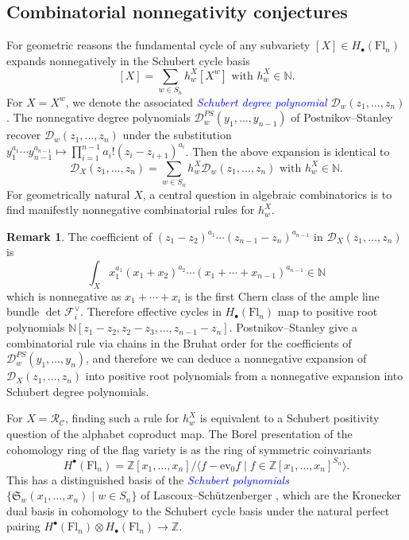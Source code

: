 \documentclass[11pt]{amsart}
\theoremstyle{definition}
\newtheorem{rem}[thm]{Remark}
\numberwithin{equation}{section}
\newcommand{\suchthat}{\;|\;}
\newcommand{\schub}[1]{\mathfrak{S}_{#1}} %
\newcommand{\ct}{\operatorname{ev_0}} %
\newcommand{\fl}[1]{\mathrm{Fl}_{#1}}
\renewcommand\emph[1]{\textcolor{blue}{\textit{#1}}} %
\begin{document}
\subsection{Combinatorial nonnegativity conjectures}
For geometric reasons \cite{Bri05} the fundamental cycle of any subvariety $[X]\in H_\bullet(\fl{n})$ expands nonnegatively in the Schubert cycle basis
$$[X]=\sum_{w\in S_n} h^X_w[X^w]\text{ with }h^X_w\in \mathbb{N}.$$
For $X=X^w$, we denote the associated \emph{Schubert degree polynomial} $\mathcal{D}_w(z_1,\ldots,z_n)$.
The nonnegative degree polynomials $\mathcal{D}_w^{PS}(y_1,\ldots,y_{n-1})$ of Postnikov--Stanley \cite{PS09} recover $\mathcal{D}_w(z_1,\ldots,z_n)$ under the substitution $y_1^{a_1}\cdots y_{n-1}^{a_{n-1}}\mapsto \prod_{i=1}^{n-1} a_i!(z_i-z_{i+1})^{a_i}$.
Then the above expansion is identical to
$$\mathcal{D}_X(z_1,\ldots,z_n)=\sum_{w\in S_n}h^X_w\mathcal{D}_w(z_1,\ldots,z_n)\text{ with }h_w^X\in \mathbb{N}.$$
For geometrically natural $X$, a central question in algebraic combinatorics is to find manifestly nonnegative combinatorial rules for $h_w^X$.
\begin{rem}
 The coefficient of $(z_1-z_2)^{a_1}\cdots(z_{n-1}-z_n)^{a_{n-1}}$ in $\mathcal{D}_X(z_1,\ldots,z_n)$ is
$$\int_X x_1^{a_1}(x_1+x_2)^{a_2}\cdots (x_1+\cdots+x_{n-1})^{a_{n-1}}\in \mathbb{N}$$
which is nonnegative as $x_1+\cdots+x_i$ is the first Chern class of the ample line bundle $\det \mathcal{F}_i^{\vee}$.
Therefore effective cycles in $H_\bullet(\fl{n})$ map to positive root polynomials $\mathbb{N}[z_1-z_2,z_2-z_3,\ldots,z_{n-1}-z_n]$.
Postnikov--Stanley \cite{PS09} give a combinatorial rule via chains in the Bruhat order for the coefficients of $\mathcal{D}^{PS}_w(y_1,\ldots,y_n)$, and therefore we can deduce a nonnegative expansion of $\mathcal{D}_X(z_1,\ldots,z_n)$ into positive root polynomials from a nonnegative expansion into Schubert degree polynomials.
\end{rem}

For $X=\mathcal{R}_{\mathcal{C}}$, finding such a rule for $h^X_w$ is equivalent to a Schubert positivity question of the alphabet coproduct map.
The Borel presentation \cite{Bor53} of the cohomology ring of the flag variety is as the ring of symmetric coinvariants
$$
H^\bullet(\fl{n})=\mathbb{Z}[x_1,\ldots,x_n]/\langle f-\ct f\suchthat f\in \mathbb{Z}[x_1,\ldots,x_n]^{S_n}\rangle.
$$
This has a distinguished basis of the \emph{Schubert polynomials} $\{\schub{w}(x_1,\ldots,x_n)\suchthat w\in S_n\}$ of Lascoux--Sch\"utzenberger \cite{LS82}, which are the Kronecker dual basis in cohomology to the Schubert cycle basis under the natural perfect pairing $H^\bullet(\fl{n})\otimes H_\bullet(\fl{n})\to \mathbb{Z}$.
\end{document}
